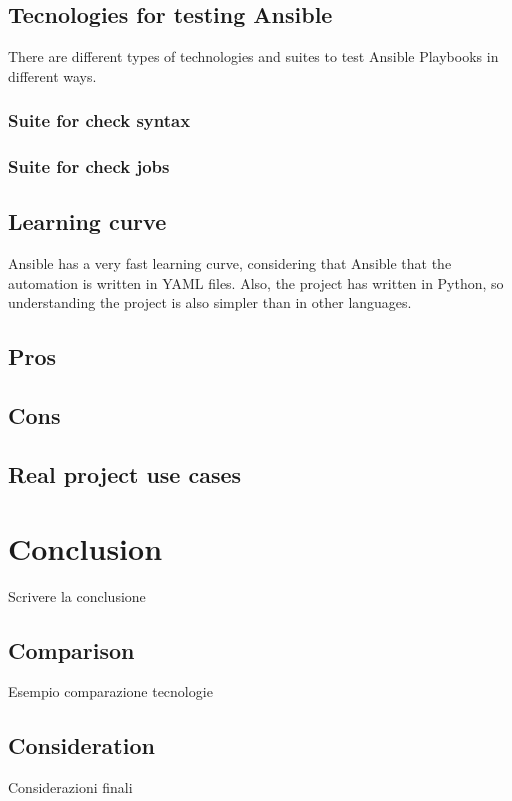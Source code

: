 \documentclass[12pt,a4paper,openright,twoside]{book}
\begin{document}
\section{Tecnologies for testing Ansible}
There are different types of technologies and suites to test Ansible Playbooks in different ways.
\subsection{Suite for check syntax}

\subsection{Suite for check jobs}

\section{Learning curve}
Ansible has a very fast learning curve, considering that Ansible that the automation is written in YAML files.
Also, the project has written in Python, so understanding the project is also simpler than in other languages.

\section{Pros}

\section{Cons}

\section{Real project use cases}


\chapter{Conclusion}
Scrivere la conclusione

\section{Comparison}
Esempio comparazione tecnologie

\section{Consideration}
Considerazioni finali
\end{document}
